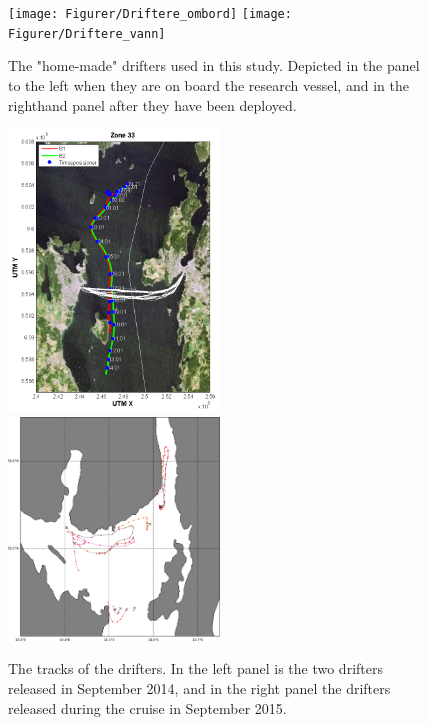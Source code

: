 \begin{figure}[ht]
\centerline{
\texttt{[image: Figurer/Driftere\_ombord]}
\texttt{[image: Figurer/Driftere\_vann]}
}
\caption{\small
The "home-made" drifters used in this study. Depicted in the panel to the left when they are on board the research vessel, and in the righthand panel after they have been deployed.}
\label{fig:drifters_design}
\end{figure}

\begin{figure}[ht]
\centerline{
\includegraphics*[width=0.5\textwidth]{Figurer/drifters_sept2014}
\includegraphics*[width=0.5\textwidth]{Figurer/drifters_low_crop}
}
\caption{\small
The tracks of the drifters. In the left panel is the two drifters released in September 2014, and in the right panel the drifters released during the cruise in September 2015.}
\label{fig:drifters_tracks}
\end{figure}

\newpage
\clearpage
